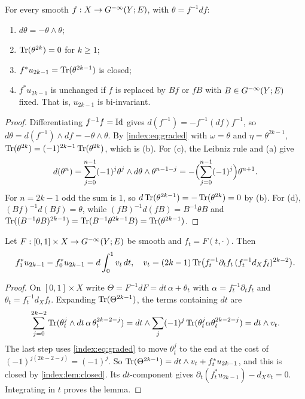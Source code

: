 \begin{lemma}\label{index:lem:closed}
  For every smooth $f:X\to G^{-\infty}(Y;E)$, with $\theta=f^{-1}df$:
  \begin{enumerate}[label=(\alph*)]
  \item $d\theta=-\theta\wedge\theta$;
  \item $\operatorname{Tr}(\theta^{2k})=0$ for $k\ge1$;
  \item $f^*u_{2k-1}=\operatorname{Tr}(\theta^{2k-1})$ is closed;
  \item $f^*u_{2k-1}$ is unchanged if $f$ is replaced by $Bf$ or $fB$ with
    $B\in G^{-\infty}(Y;E)$ fixed. That is, $u_{2k-1}$ is bi-invariant.
  \end{enumerate}
\end{lemma}
\begin{proof}
  Differentiating $f^{-1}f=\operatorname{Id}$ gives $d(f^{-1})=-f^{-1}(df)f^{-1}$, so
  $d\theta=d(f^{-1})\wedge df=-\theta\wedge\theta$. By \eqref{index:eq:graded}
  with $\omega=\theta$ and $\eta=\theta^{2k-1}$,
  $\operatorname{Tr}(\theta^{2k})=(-1)^{2k-1}\operatorname{Tr}(\theta^{2k})$, which is (b). For (c), the
  Leibniz rule and (a) give
  \begin{equation*}
    d(\theta^{n})=\sum_{j=0}^{n-1}(-1)^j\theta^j\wedge d\theta\wedge
    \theta^{n-1-j}=-\Bigl(\sum_{j=0}^{n-1}(-1)^j\Bigr)\theta^{n+1}.
  \end{equation*}
  For $n=2k-1$ odd the sum is $1$, so $d\operatorname{Tr}(\theta^{2k-1})=-\operatorname{Tr}(\theta^{2k})=0$
  by (b). For (d), $(Bf)^{-1}d(Bf)=\theta$, while
  $(fB)^{-1}d(fB)=B^{-1}\theta B$ and
  $\operatorname{Tr}((B^{-1}\theta B)^{2k-1})=\operatorname{Tr}(B^{-1}\theta^{2k-1}B)=\operatorname{Tr}(\theta^{2k-1})$.
\end{proof}

\begin{lemma}\label{index:lem:transgression}
  Let $F:[0,1]\times X\to G^{-\infty}(Y;E)$ be smooth and $f_t=F(t,\cdot)$. Then
  \begin{equation*}
    f_1^*u_{2k-1}-f_0^*u_{2k-1}=d\int_0^1v_t\,dt,\quad
    v_t=(2k-1)\operatorname{Tr}\bigl(f_t^{-1}\partial_tf_t\,(f_t^{-1}d_Xf_t)^{2k-2}\bigr).
  \end{equation*}
\end{lemma}
\begin{proof}
  On $[0,1]\times X$ write $\Theta=F^{-1}dF=dt\,\alpha+\theta_t$ with
  $\alpha=f_t^{-1}\partial_tf_t$ and $\theta_t=f_t^{-1}d_Xf_t$. Expanding
  $\operatorname{Tr}(\Theta^{2k-1})$, the terms containing $dt$ are
  \begin{equation*}
    \sum_{j=0}^{2k-2}\operatorname{Tr}(\theta_t^j\wedge dt\,\alpha\,\theta_t^{2k-2-j})
    =dt\wedge\sum_j(-1)^j\operatorname{Tr}(\theta_t^j\alpha\theta_t^{2k-2-j})
    =dt\wedge v_t.
  \end{equation*}
  The last step uses \eqref{index:eq:graded} to move $\theta_t^j$ to the end
  at the cost of $(-1)^{j(2k-2-j)}=(-1)^j$. So
  $\operatorname{Tr}(\Theta^{2k-1})=dt\wedge v_t+f_t^*u_{2k-1}$, and this is closed by
  \cref{index:lem:closed}. Its $dt$-component gives
  $\partial_t(f_t^*u_{2k-1})-d_Xv_t=0$. Integrating in $t$ proves the
  lemma.
\end{proof}

